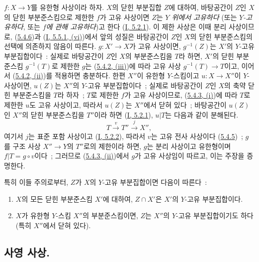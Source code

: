 \begin{env}[5.4.10]
\label{II.5.4.10-ko}
$f:X\to Y$를 유한형 사상이라 하자. $X$의 닫힌 부분집합 $Z$에 대하여,
바탕공간이 $Z$인 $X$의 닫힌 부분준스킴으로 제한한 $f$가 고유 사상이면
$Z$는 \emph{$Y$ 위에서 고유하다} (또는 \emph{$Y$-고유하다}, 또는
\emph{$f$에 관해 고유하다})고 한다
(\hyperref[I.5.2.1-ko]{I, 5.2.1}). 이 제한 사상은 이때 분리 사상이므로,
(\hyperref[II.5.4.6-ko]{5.4.6})과
(\hyperref[I.5.5.1-ko]{I, 5.5.1, (vi)})에서 앞의 성질은 바탕공간이
$Z$인 $X$의 닫힌 부분준스킴의 선택에 의존하지 않음이 따른다.
$g:X'\to X$가 고유 사상이면, $g^{-1}(Z)$는 $X'$의 $Y$-고유
부분집합이다~: 실제로 바탕공간이 $Z$인 $X$의 부분준스킴을 $T$라 하면,
$X'$의 닫힌 부분준스킴 $g^{-1}(T)$로 제한한 $g$는
(\hyperref[II.5.4.2-ko]{5.4.2, (iii)})에 따라 고유 사상
$g^{-1}(T)\to T$이고, 이어서
(\hyperref[II.5.4.2-ko]{5.4.2, (ii)})를 적용하면 충분하다. 한편 $X''$이
유한형 $Y$-스킴이고 $u:X\to X''$이 $Y$-사상이면, $u(Z)$는 $X''$의
$Y$-고유 부분집합이다~; 실제로 바탕공간이 $Z$인 $X$의 축약 닫힌
부분준스킴을 $T$라 하자~; $T$로 제한한 $f$가 고유 사상이므로,
(\hyperref[II.5.4.3-ko]{5.4.3, (i)})에 따라 $T$로 제한한 $u$도 고유
사상이고, 따라서 $u(Z)$는 $X''$에서 닫혀 있다~; 바탕공간이 $u(Z)$인
$X''$의 닫힌 부분준스킴을 $T''$이라 하면
(\hyperref[I.5.2.1-ko]{I, 5.2.1}), $u|T$는 다음과 같이 분해된다.
\[
  T\xrightarrow{v}T''\xrightarrow{j}X'',
\]
여기서 $j$는 표준 포함 사상이고
(\hyperref[I.5.2.2-ko]{I, 5.2.2}), 따라서 $v$는 고유 전사 사상이다
(\hyperref[II.5.4.5-ko]{5.4.5})~; $g$를 구조 사상 $X''\to Y$의
$T''$로의 제한이라 하면, $g$는 분리 사상이고 유한형이며
$f|T=g\circ v$이다~; 그러므로
(\hyperref[II.5.4.3-ko]{5.4.3, (ii)})에서 $g$가 고유 사상임이 따르고,
이는 주장을 증명한다.
\end{env}

특히 이들 주의로부터, $Z$가 $X$의 $Y$-고유 부분집합이면 다음이
따른다~:
\begin{enumerate}
  \item[\rm{1\textsuperscript{o}}] $X$의 모든 닫힌 부분준스킴 $X'$에
  대하여, $Z\cap X'$은 $X'$의 $Y$-고유 부분집합이다.
  \item[\rm{2\textsuperscript{o}}] $X$가 유한형 $Y$-스킴 $X''$의
  부분준스킴이면, $Z$는 $X''$의 $Y$-고유 부분집합이기도 하다
  (특히 $X''$에서 닫혀 있다).
\end{enumerate}

\subsection{사영 사상.}
\label{subsection:II.5.5-ko}

